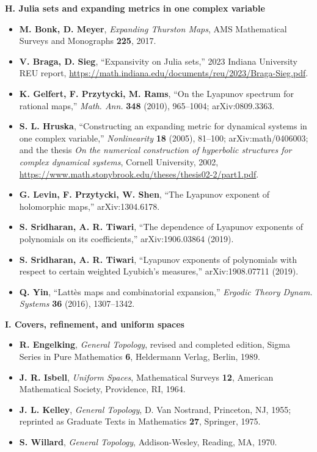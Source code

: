\documentclass[
]{article}
\providecommand{\tightlist}{%
  \setlength{\itemsep}{0pt}\setlength{\parskip}{0pt}}
\begin{document}
\textbf{H. Julia sets and expanding metrics in one complex variable}

\begin{itemize}
\tightlist
\item
  \textbf{M. Bonk, D. Meyer}, \emph{Expanding Thurston Maps}, AMS
  Mathematical Surveys and Monographs \textbf{225}, 2017.
\item
  \textbf{V. Braga, D. Sieg}, ``Expansivity on Julia sets,'' 2023
  Indiana University REU report,
  \url{https://math.indiana.edu/documents/reu/2023/Braga-Sieg.pdf}.
\item
  \textbf{K. Gelfert, F. Przytycki, M. Rams}, ``On the Lyapunov spectrum
  for rational maps,'' \emph{Math. Ann.} \textbf{348} (2010), 965--1004;
  arXiv:0809.3363.
\item
  \textbf{S. L. Hruska}, ``Constructing an expanding metric for
  dynamical systems in one complex variable,'' \emph{Nonlinearity}
  \textbf{18} (2005), 81--100; arXiv:math/0406003; and the thesis
  \emph{On the numerical construction of hyperbolic structures for
  complex dynamical systems}, Cornell University, 2002,
  \url{https://www.math.stonybrook.edu/theses/thesis02-2/part1.pdf}.
\item
  \textbf{G. Levin, F. Przytycki, W. Shen}, ``The Lyapunov exponent of
  holomorphic maps,'' arXiv:1304.6178.
\item
  \textbf{S. Sridharan, A. R. Tiwari}, ``The dependence of Lyapunov
  exponents of polynomials on its coefficients,'' arXiv:1906.03864
  (2019).
\item
  \textbf{S. Sridharan, A. R. Tiwari}, ``Lyapunov exponents of
  polynomials with respect to certain weighted Lyubich's measures,''
  arXiv:1908.07711 (2019).
\item
  \textbf{Q. Yin}, ``Latt\`{e}s maps and combinatorial expansion,''
  \emph{Ergodic Theory Dynam. Systems} \textbf{36} (2016), 1307--1342.
\end{itemize}

\textbf{I. Covers, refinement, and uniform spaces}

\begin{itemize}
\tightlist
\item
  \textbf{R. Engelking}, \emph{General Topology}, revised and completed
  edition, Sigma Series in Pure Mathematics \textbf{6}, Heldermann
  Verlag, Berlin, 1989.
\item
  \textbf{J. R. Isbell}, \emph{Uniform Spaces}, Mathematical Surveys
  \textbf{12}, American Mathematical Society, Providence, RI, 1964.
\item
  \textbf{J. L. Kelley}, \emph{General Topology}, D. Van Nostrand,
  Princeton, NJ, 1955; reprinted as Graduate Texts in Mathematics
  \textbf{27}, Springer, 1975.
\item
  \textbf{S. Willard}, \emph{General Topology}, Addison-Wesley, Reading,
  MA, 1970.
\end{itemize}
\end{document}
